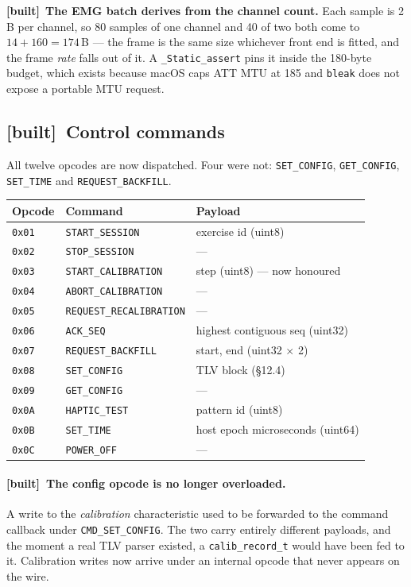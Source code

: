 \documentclass[11pt]{article}
\newcommand{\built}{{\sffamily\scriptsize\color{good}\textbf{[built]}}\ }
\begin{document}
\noindent
\built \textbf{The EMG batch derives from the channel count.} Each sample is
2\,B per channel, so 80 samples of one channel and 40 of two both come to
$14 + 160 = 174$\,B --- the frame is the same size whichever front end is
fitted, and the frame \emph{rate} falls out of it. A
\texttt{\_Static\_assert} pins it inside the 180-byte budget, which exists
because macOS caps ATT MTU at 185 and \texttt{bleak} does not expose a
portable MTU request.

\subsection{\built Control commands}

All twelve opcodes are now dispatched. Four were not: \texttt{SET\_CONFIG},
\texttt{GET\_CONFIG}, \texttt{SET\_TIME} and \texttt{REQUEST\_BACKFILL}.

\begin{table}[H]
\centering\small
\begin{tabularx}{\linewidth}{@{}p{12mm} p{42mm} X@{}}
\toprule
\textbf{Opcode} & \textbf{Command} & \textbf{Payload} \\
\midrule
\texttt{0x01} & \texttt{START\_SESSION} & exercise id (uint8) \\
\texttt{0x02} & \texttt{STOP\_SESSION} & --- \\
\texttt{0x03} & \texttt{START\_CALIBRATION} & step (uint8) --- now honoured \\
\texttt{0x04} & \texttt{ABORT\_CALIBRATION} & --- \\
\texttt{0x05} & \texttt{REQUEST\_RECALIBRATION} & --- \\
\texttt{0x06} & \texttt{ACK\_SEQ} & highest contiguous seq (uint32) \\
\texttt{0x07} & \texttt{REQUEST\_BACKFILL} & start, end (uint32 $\times$ 2) \\
\texttt{0x08} & \texttt{SET\_CONFIG} & TLV block (\S12.4) \\
\texttt{0x09} & \texttt{GET\_CONFIG} & --- \\
\texttt{0x0A} & \texttt{HAPTIC\_TEST} & pattern id (uint8) \\
\texttt{0x0B} & \texttt{SET\_TIME} & host epoch microseconds (uint64) \\
\texttt{0x0C} & \texttt{POWER\_OFF} & --- \\
\bottomrule
\end{tabularx}
\end{table}

\paragraph{\built The config opcode is no longer overloaded.} A write to the
\emph{calibration} characteristic used to be forwarded to the command callback
under \texttt{CMD\_SET\_CONFIG}. The two carry entirely different payloads,
and the moment a real TLV parser existed, a \texttt{calib\_record\_t} would
have been fed to it. Calibration writes now arrive under an internal opcode
that never appears on the wire.
\end{document}
